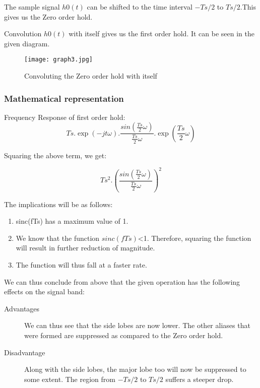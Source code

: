 The sample signal $h0(t)$ can be shifted to the time interval $-Ts/2$ to $Ts/2$.This gives us the Zero order hold. 

Convolution $h0(t)$ with itself gives us the first order hold. It can be seen in the given diagram.
\begin{figure}[h]
\centering
\texttt{[image: graph3.jpg]}
\caption{Convoluting the Zero order hold with itself}
\end{figure}
\pagebreak

\subsubsection{Mathematical representation}

Frequency Response of first order hold:
$$Ts.\exp(-jt\omega).\frac{sin(\frac{Ts}{2}\omega)}{\frac{Ts}{2}\omega}.\exp(\frac{Ts}{2}\omega)$$

Squaring the above term, we get:

$$Ts^2.(\frac{sin(\frac{Ts}{2}\omega)}{\frac{Ts}{2}\omega})^2$$

The implications will be as follows:
\begin{enumerate}
\item sinc(fTs) has a maximum value of 1.
\item We know that the function $sinc(fTs)$<1. Therefore, squaring the function will result in further reduction of magnitude.
\item The function will thus fall at a faster rate.
\end{enumerate}

We can thus conclude from above that the given operation has the following effects on the signal band:

\begin{description}
\item[Advantages] We can thus see that the side lobes are now lower. The other aliases that were formed are suppressed as compared to the Zero order hold.

\item[Disadvantage] Along with the side lobes, the major lobe too will now be suppressed to some extent. The region from $-Ts/2$ to $Ts/2$ suffers a steeper drop.  
\end{description}






